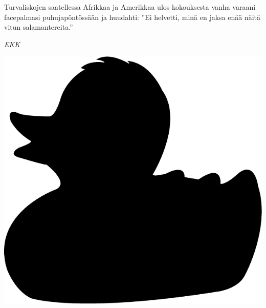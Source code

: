{Turvaliskojen saatellessa Afrikkaa ja Amerikkaa ulos ko\-kouk\-ses\-ta vanha varaani facepalmasi puhujapöntössään ja huudahti: ''Ei helvetti, minä en jaksa enää näitä vitun sala\-man\-te\-rei\-ta.''\\
\vspace{3mm}

\emph{EKK}\\}

\ifodd\value{page}\clearpage\fi
\vspace*{\fill}
{
\hfill\includegraphics[scale=0.075]{graphics/rubber-duck.png}\hfill
}
\vspace*{\fill}
\clearpage

